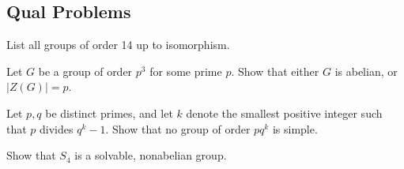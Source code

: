 \newpage
\subsection{Qual Problems}

\begin{problem}
\label{prob:2.8}
List all groups of order 14 up to isomorphism.
\end{problem}

\begin{problem}
\label{prob:2.9}
Let $G$ be a group of order $p^3$ for some prime $p$. Show that either $G$ is abelian, or $\left| Z(G) \right| = p$.
\end{problem}

\begin{problem}
\label{prob:2.10}
Let $p,q$ be distinct primes, and let $k$ denote the smallest positive integer such that $p$ divides $q^k - 1$. Show that no group of order $pq^k$ is simple.
\end{problem}

\begin{problem}
\label{prob:2.11}
Show that $S_4$ is a solvable, nonabelian group.
\end{problem}